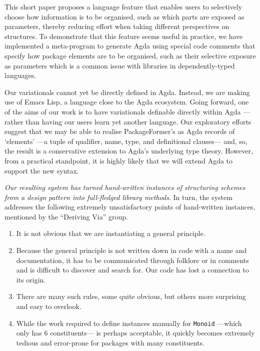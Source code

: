 \documentclass[sigplan,screen]{acmart}
\begin{document}
This short paper proposes a language feature that enables users to selectively
choose how information is to be organised, such as which parts are exposed as parameters,
thereby reducing effort when taking different perspectives on structures.
To demonstrate that this feature seems useful in practice,
we have implemented a meta-program to generate Agda using special code comments
that specify how package elements are to be organised, such as their selective exposure
as parameters which is a common issue with libraries in dependently-typed languages.

Our variationals
cannot yet be directly defined in Agda. Instead, we are making use of Emacs Lisp, a language
close to the Agda ecosystem. Going forward, one of the aims of our work is to have variationals
definable directly within Agda ---rather than having our users learn yet another language.
Our exploratory efforts suggest that we may be able to realise PackageFormer's as Agda records
of ‘elements’ ---a tuple of qualifier, name, type, and definitional clauses---
and, so, the result is a conservative extension to Agda's underlying type theory.
However, from a practical standpoint, it is highly
likely that we will extend Agda to support the new syntax.

\emph{Our resulting system has turned hand-written instances of structuring schemes from a design}
\emph{pattern into full-fledged library methods}. In turn, the system addresses the following
extremely unsatisfactory points of hand-written instances, mentioned by the “Deriving Via” \cite{deriving_via} group.

\newpage
\begin{quoting}
\begin{enumerate}
\item It is not obvious that we are instantiating a general principle.

\item Because the general principle is not written down in
code with a name and documentation, it has to be communicated
through folklore or in comments and is difficult to discover
and search for. Our code has lost a connection to its origin.

\item There are many such rules, some quite obvious, but
others more surprising and easy to overlook.

\item While the work required to define instances manually for \texttt{Monoid}
---which only has 6 constituents--- is perhaps acceptable,
it quickly becomes extremely tedious and error-prone for packages
with many constituents.
\end{enumerate}
\end{quoting}
\end{document}
